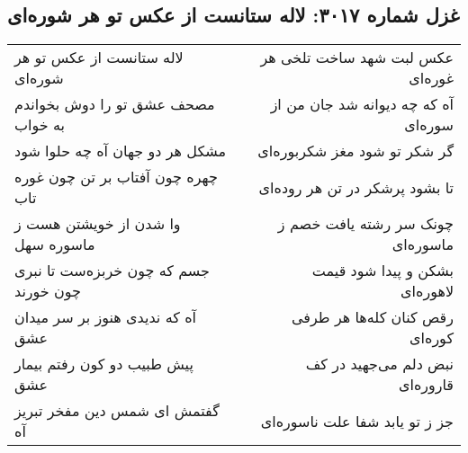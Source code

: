\begin{center}
\section*{غزل شماره ۳۰۱۷: لاله ستانست از عکس تو هر شوره‌ای}
\label{sec:3017}
\begin{longtable}{l p{0.5cm} r}
لاله ستانست از عکس تو هر شوره‌ای
&&
عکس لبت شهد ساخت تلخی هر غوره‌ای
\\
مصحف عشق تو را دوش بخواندم به خواب
&&
آه که چه دیوانه شد جان من از سوره‌ای
\\
مشکل هر دو جهان آه چه حلوا شود
&&
گر شکر تو شود مغز شکربوره‌ای
\\
چهره چون آفتاب بر تن چون غوره تاب
&&
تا بشود پرشکر در تن هر روده‌ای
\\
وا شدن از خویشتن هست ز ماسوره سهل
&&
چونک سر رشته یافت خصم ز ماسوره‌ای
\\
جسم که چون خربزه‌ست تا نبری چون خورند
&&
بشکن و پیدا شود قیمت لاهوره‌ای
\\
آه که ندیدی هنوز بر سر میدان عشق
&&
رقص کنان کله‌ها هر طرفی کوره‌ای
\\
پیش طبیب دو کون رفتم بیمار عشق
&&
نبض دلم می‌جهید در کف قاروره‌ای
\\
گفتمش ای شمس دین مفخر تبریز آه
&&
جز ز تو یابد شفا علت ناسوره‌ای
\\
\end{longtable}
\end{center}
